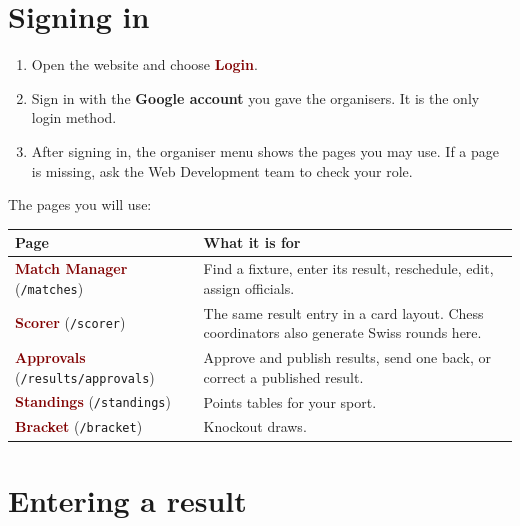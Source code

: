 \documentclass[11pt,a4paper]{article}
\newcommand{\ui}[1]{\textbf{\textcolor{maroon}{#1}}}
\begin{document}
\section{Signing in}

\begin{enumerate}
  \item Open the website and choose \ui{Login}.
  \item Sign in with the \textbf{Google account} you gave the organisers. It is the only login method.
  \item After signing in, the organiser menu shows the pages you may use. If a page is missing, ask the Web Development team to check your role.
\end{enumerate}

The pages you will use:

\begin{center}
\begin{tabularx}{\textwidth}{@{}lX@{}}
\toprule
\textbf{Page} & \textbf{What it is for}\\
\midrule
\ui{Match Manager} (\texttt{/matches}) & Find a fixture, enter its result, reschedule, edit, assign officials.\\
\ui{Scorer} (\texttt{/scorer}) & The same result entry in a card layout. Chess coordinators also generate Swiss rounds here.\\
\ui{Approvals} (\texttt{/results/approvals}) & Approve and publish results, send one back, or correct a published result.\\
\ui{Standings} (\texttt{/standings}) & Points tables for your sport.\\
\ui{Bracket} (\texttt{/bracket}) & Knockout draws.\\
\bottomrule
\end{tabularx}
\end{center}

\section{Entering a result}
\end{document}
